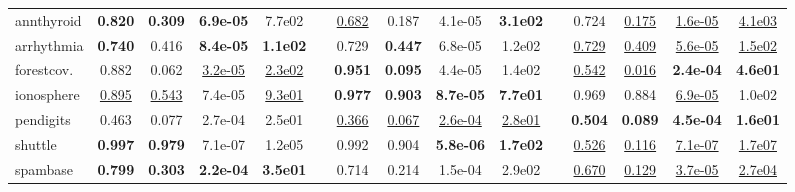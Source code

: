 \begin{table}[!ht]
{\begin{tabular}{l cccc c cccc c cccc}
annthyroid   &\bf 0.820 &\bf 0.309 &\bf 6.9e-05&7.7e02 & &\underline{0.682}  &0.187  &4.1e-05&\bf 3.1e02  &   &0.724 &\underline{0.175} &\underline{1.6e-05}&\underline{4.1e03} \\
arrhythmia   &\bf 0.740 &0.416 &\bf 8.4e-05&\bf 1.1e02 & &0.729  &\bf 0.447  &6.8e-05&1.2e02   &  &\underline{0.729} &\underline{0.409} &\underline{5.6e-05}&\underline{1.5e02} \\
forestcov.   &0.882 &0.062 &\underline{3.2e-05}&\underline{2.3e02} & &\bf 0.951  &\bf 0.095  &4.4e-05&1.4e02    & &\underline{0.542} &\underline{0.016} &\bf 2.4e-04 &\bf 4.6e01 \\
ionosphere   &\underline{0.895} &\underline{0.543} &7.4e-05&\underline{9.3e01} & &\bf 0.977  &\bf 0.903  &\bf 8.7e-05&\bf 7.7e01   &  &0.969 &0.884 &\underline{6.9e-05}&1.0e02 \\
pendigits    &0.463 &0.077 &2.7e-04&2.5e01 & &\underline{0.366}  &\underline{0.067}  &\underline{2.6e-04}&\underline{2.8e01}&   &\bf 0.504 &\bf 0.089 &\bf 4.5e-04&\bf 1.6e01 \\
shuttle      &\bf 0.997 &\bf 0.979 &7.1e-07&1.2e05 & &0.992  &0.904  &\bf 5.8e-06&\bf 1.7e02  &   &\underline{0.526} &\underline{0.116} &\underline{7.1e-07}&\underline{1.7e07} \\
spambase     &\bf 0.799 &\bf 0.303 &\bf 2.2e-04&\bf 3.5e01 & &0.714  &0.214  &1.5e-04&2.9e02  &   &\underline{0.670} &\underline{0.129} &\underline{3.7e-05}&\underline{2.7e04} \\
\bottomrule
\end{tabular}
}
\end{table}





